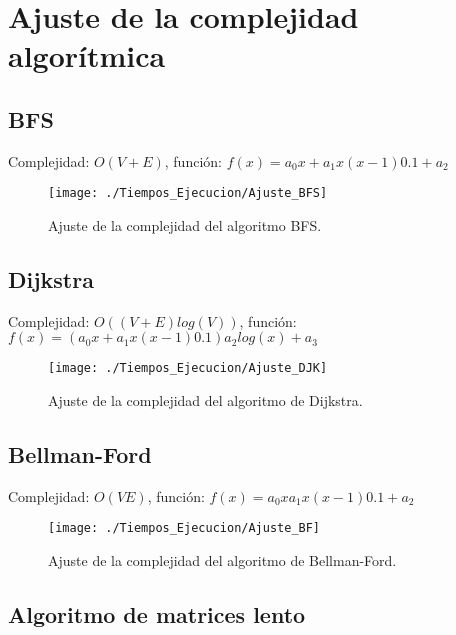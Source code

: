 
\chapter{Ajuste de la complejidad algorítmica}\label{ap:apendice3}

\section{BFS}

Complejidad: $O(V+E)$, función: $f(x) = a_0x + a_1x(x-1)0.1 + a_2$

\begin{figure}[!htb]
	\centering
	\texttt{[image: ./Tiempos\_Ejecucion/Ajuste\_BFS]}
	
	\caption{Ajuste de la complejidad del algoritmo BFS.}
	\label{fig:ajuste_BFS}
\end{figure}

\section{Dijkstra}

Complejidad: $O((V+E)log(V))$, función: $f(x) = (a_0x + a_1x(x-1)0.1)a_2log(x) + a_3$

\begin{figure}[!htb]
	\centering
	\texttt{[image: ./Tiempos\_Ejecucion/Ajuste\_DJK]}
	
	\caption{Ajuste de la complejidad del algoritmo de Dijkstra.}
	\label{fig:ajuste_DJK}
\end{figure}

\section{Bellman-Ford}

Complejidad: $O(VE)$, función: $f(x) = a_0xa_1x(x-1)0.1 + a_2$

\begin{figure}[!htb]
	\centering
	\texttt{[image: ./Tiempos\_Ejecucion/Ajuste\_BF]}
	
	\caption{Ajuste de la complejidad del algoritmo de Bellman-Ford.}
	\label{fig:ajuste_BF}
\end{figure}

\section{Algoritmo de matrices lento}

